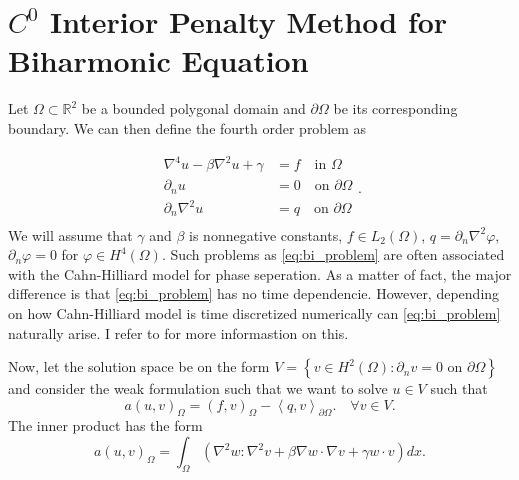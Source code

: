 \newpage
\section{ $C^0$ Interior Penalty Method for Biharmonic Equation}
\label{sec:ch1}



Let $\Omega \subset   \mathbb{R} ^2$ be a bounded polygonal domain and $\partial \Omega $ be its corresponding boundary.
We can then define the fourth order problem as

\begin{equation}
\label{eq:bi_problem}
\begin{split}
    \nabla ^4 u - \beta \nabla ^2 u  + \gamma  & = f \quad \text{in } \Omega   \\
    \partial _{n} u & = 0 \quad \text{on } \partial \Omega  \\
    \partial _{n} \nabla ^2 u & = q \quad \text{on } \partial \Omega   \\
\end{split}
.\end{equation}
We will assume that $\gamma $ and $\beta $ is nonnegative constants, $f \in L_{2}\left( \Omega  \right) $, $q =
\partial _{n} \nabla ^2 \varphi $, $ \partial _{n}\varphi  = 0 $ for $ \varphi  \in H^{4}\left(  \Omega
\right)$. Such problems as \eqref{eq:bi_problem} are often associated with the Cahn-Hilliard model
\cite{cahnhilliard1957} for phase seperation. As a matter of fact, the major difference is that \eqref{eq:bi_problem}
has no time dependencie. However, depending on how Cahn-Hilliard model is time discretized numerically can
\eqref{eq:bi_problem} naturally arise. I refer to \cite{brenner2012quadratic} for more informastion on this.

Now, let the solution space be on the form  $V = \left\{ v \in H^2\left( \Omega  \right) : \partial _{n} v = 0  \text{ on }
\partial \Omega  \right\} $ and consider the weak formulation such that we want to solve $u \in  V$ such that
\begin{equation}
\label{eq:bi_harmonic_weak}
a\left( u,v \right)_{\Omega } = \left( f,v \right)_{\Omega } - \left<q,v \right>_{\partial \Omega }. \quad \forall v \in
V
.\end{equation}
The inner product has the form \[
a\left( u,v \right)_{\Omega } = \int_{\Omega }^{} \left( \nabla ^2 w : \nabla ^2 v + \beta \nabla w\cdot \nabla v +
\gamma w\cdot v \right) dx  .
\]

